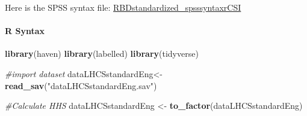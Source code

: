 \documentclass[
]{article}
\newenvironment{Shaded}{\begin{snugshade}}{\end{snugshade}}
\newcommand{\CommentTok}[1]{\textcolor[rgb]{0.56,0.35,0.01}{\textit{#1}}}
\newcommand{\KeywordTok}[1]{\textcolor[rgb]{0.13,0.29,0.53}{\textbf{#1}}}
\newcommand{\NormalTok}[1]{#1}
\newcommand{\StringTok}[1]{\textcolor[rgb]{0.31,0.60,0.02}{#1}}
\begin{document}
Here is the SPSS syntax file:
\href{https://www.dropbox.com/s/gsj4tvadww9v3q4/RBDstandardized_questionnairerCSI.xlsx?dl=0}{RBDstandardized\_spsssyntaxrCSI}

\hypertarget{r-syntax-3}{%
\paragraph{R Syntax}\label{r-syntax-3}}

\begin{Shaded}
\begin{Highlighting}[]
\KeywordTok{library}\NormalTok{(haven)}
\KeywordTok{library}\NormalTok{(labelled)}
\KeywordTok{library}\NormalTok{(tidyverse)}

\CommentTok{#import dataset}
\NormalTok{dataLHCSstandardEng<-}\StringTok{ }\KeywordTok{read_sav}\NormalTok{(}\StringTok{"dataLHCSstandardEng.sav"}\NormalTok{)}

\CommentTok{#Calculate HHS }
\NormalTok{dataLHCSstandardEng <-}\StringTok{ }\KeywordTok{to_factor}\NormalTok{(dataLHCSstandardEng)}


\end{Highlighting}
\end{Shaded}
\end{document}
